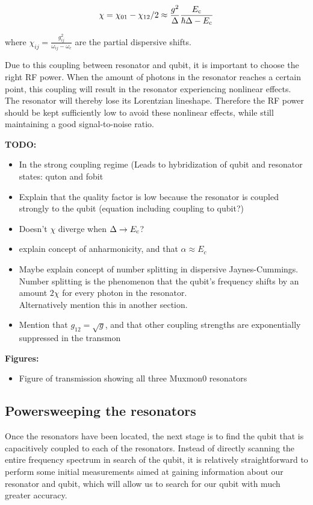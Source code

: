         \begin{equation}
          \chi = \chi_{01} - \chi_{12}/2 \approx \frac{g^2}{\Delta}\frac{E_\text{c}}{\hbar \Delta - E_\text{c}}
          \label{eq:dispersive-shift}
        \end{equation}

        where $\chi_{ij} = \frac{g_{ij}^2}{\omega_{ij}-\omega_c}$ are the partial dispersive shifts.

        Due to this coupling between resonator and qubit, it is important to choose the right RF power. When the amount of photons in the resonator reaches a certain point, this coupling will result in the resonator experiencing nonlinear effects. The resonator will thereby lose its Lorentzian lineshape. Therefore the RF power should be kept sufficiently low to avoid these nonlinear effects, while still maintaining a good signal-to-noise ratio.



        \textbf{TODO:}
        \begin{itemize}
          \item In the strong coupling regime (Leads to hybridization of qubit and resonator states: quton and fobit
          \item Explain that the quality factor is low because the resonator is coupled strongly to the qubit (equation including coupling to qubit?)
          \item Doesn't $\chi$ diverge when $\Delta \rightarrow E_\text{c}$?
          \item explain concept of anharmonicity, and that $\alpha \approx E_c$
          \item Maybe explain concept of number splitting in dispersive Jaynes-Cummings. Number splitting is the phenomenon that the qubit's frequency shifts by an amount $2 \chi$ for every photon in the resonator.\\
                Alternatively mention this in another section.
          \item Mention that $g_{12}=\sqrt{g}$, and that other coupling strengths are exponentially suppressed in the transmon
        \end{itemize}

        \textbf{Figures:}
        \begin{itemize}
          \item Figure of transmission showing all three Muxmon0 resonators
        \end{itemize}

      \subsection{Powersweeping the resonators}
        Once the resonators have been located, the next stage is to find the qubit that is capacitively coupled to each of the resonators. Instead of directly scanning the entire frequency spectrum in search of the qubit, it is relatively straightforward to perform some initial measurements aimed at gaining information about our resonator and qubit, which will allow us to search for our qubit with much greater accuracy.

